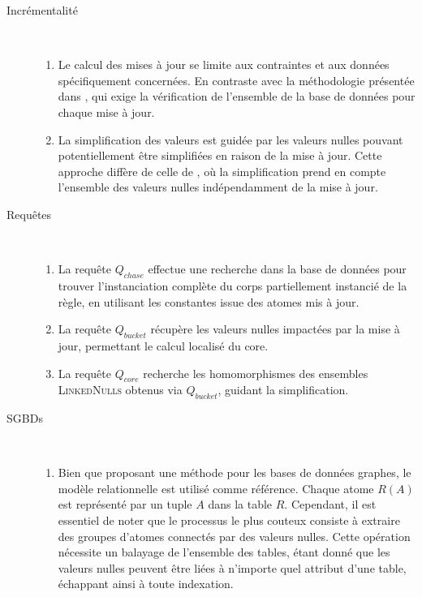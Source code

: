 \begin{description}
    \item[Incrémentalité] ~
    \begin{enumerate}
        \item Le calcul des mises à jour se limite aux contraintes et aux données spécifiquement concernées.
        En contraste avec la méthodologie présentée dans \cite{chabinConsistentUpdatingDatabases2020}, qui exige la vérification de l'ensemble de la base de données pour chaque mise à jour.
        
        \item La simplification des valeurs est guidée par les valeurs nulles pouvant potentiellement être simplifiées en raison de la mise à jour.
        Cette approche diffère de celle de \cite{chabinConsistentUpdatingDatabases2020}, où la simplification prend en compte l'ensemble des valeurs nulles indépendamment de la mise à jour.
    \end{enumerate}

    \item[Requêtes] ~
    \begin{enumerate}
        \item La requête $Q_{chase}$ effectue une recherche dans la base de données pour trouver l'instanciation complète du corps partiellement instancié de la règle, en utilisant les constantes issue des atomes mis à jour.
        
        \item La requête $Q_{bucket}$ récupère les valeurs nulles impactées par la mise à jour, permettant le calcul localisé du \gls{core}.

        \item La requête $Q_{core}$ recherche les homomorphismes des ensembles \textsc{LinkedNulls} obtenus via $Q_{bucket}$, guidant la simplification.
    \end{enumerate}

    \item[SGBDs] ~
    \begin{enumerate}
        \item Bien que proposant une méthode pour les bases de données graphes, le modèle relationnelle est utilisé comme référence.
        Chaque atome $R(A)$ est représenté par un tuple $A$ dans la table $R$.
        Cependant, il est essentiel de noter que le processus le plus couteux consiste à extraire des groupes d'atomes connectés par des valeurs nulles.
        Cette opération nécessite un balayage de l'ensemble des tables, étant donné que les valeurs nulles peuvent être liées à n'importe quel attribut d'une table, échappant ainsi à toute indexation.
        

\end{enumerate}
\end{description}
